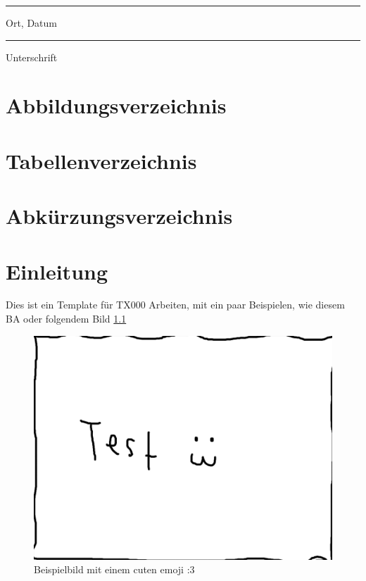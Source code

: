 \documentclass[12pt]{report}
\begin{document}
\vspace{2.5cm}

\parbox{6.5cm}{\hrule\medskip Ort, Datum}  \hfill \parbox{6.5cm}{\hrule\medskip Unterschrift} \hspace{3cm}


\newpage
\chapter*{Abbildungsverzeichnis}

\listoffigures


\newpage
\chapter*{Tabellenverzeichnis}

\listoftables


\newpage
\chapter*{Abkürzungsverzeichnis}

\begin{acronym}[SOAP]
\end{acronym}

\newpage
{}
\chapter{Einleitung}

Dies ist ein Template für TX000 Arbeiten, mit ein paar Beispielen, wie diesem \ac{BA} oder folgendem Bild \ref{fig:example image}

\begin{figure}[h]
	\centering
	\includegraphics[width=0.5 \linewidth]{example}
	\caption{Beispielbild mit einem cuten emoji :3}
	\label{fig:example image}
\end{figure}
\end{document}
